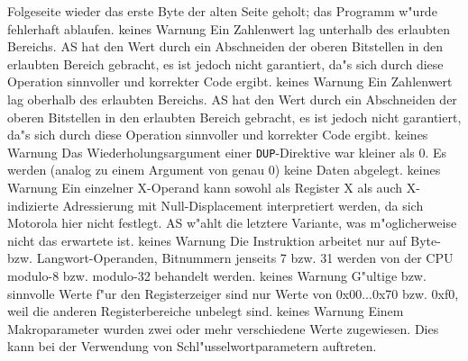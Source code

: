 \documentclass[12pt,a4paper,twoside]{report}
\newcommand{\tty}[1]{{\tt #1}}
\newcommand{\asname}{AS}
\begin{document}
\begin{description}
{                Folgeseite wieder das erste Byte der alten Seite geholt; das
                Programm w"urde fehlerhaft ablaufen.}
	       {keines}
               {Warnung}
               {Ein Zahlenwert lag unterhalb des erlaubten Bereichs.  \asname{}
                hat den Wert durch ein Abschneiden der oberen Bitstellen
                in den erlaubten Bereich gebracht, es ist jedoch nicht
                garantiert, da"s sich durch diese Operation sinnvoller und
                korrekter Code ergibt.}
               {keines}
               {Warnung}
               {Ein Zahlenwert lag oberhalb des erlaubten Bereichs.  \asname{}
                hat den Wert durch ein Abschneiden der oberen Bitstellen
                in den erlaubten Bereich gebracht, es ist jedoch nicht
                garantiert, da"s sich durch diese Operation sinnvoller und
                korrekter Code ergibt.}
               {keines}
               {Warnung}
               {Das Wiederholungsargument einer \tty{DUP}-Direktive war
                kleiner als 0.  Es werden (analog zu einem Argument von
                genau 0) keine Daten abgelegt.}
               {keines}
               {Warnung}
               {Ein einzelner X-Operand kann sowohl als Register X als
                auch X-indizierte Adressierung mit Null-Displacement
                interpretiert werden, da sich Motorola hier nicht festlegt.
                \asname{} w"ahlt die letztere Variante, was m"oglicherweise nicht
                das erwartete ist.}
               {keines}
               {Warnung}
               {Die Instruktion arbeitet nur auf Byte- bzw.
                Langwort-Operanden, Bitnummern jenseits 7 bzw. 31 werden
                von der CPU modulo-8 bzw. modulo-32 behandelt werden.}
               {keines}
               {Warnung}
               {G"ultige bzw. sinnvolle Werte f"ur den Registerzeiger sind
                nur Werte von 0x00...0x70 bzw. 0xf0, weil die anderen
                Registerbereiche unbelegt sind.}
               {keines}
               {Warnung}
               {Einem Makroparameter wurden zwei oder mehr
                verschiedene Werte zugewiesen.  Dies kann bei der
                Verwendung von Schl"usselwortparametern auftreten.
}
\end{description}
\end{document}

